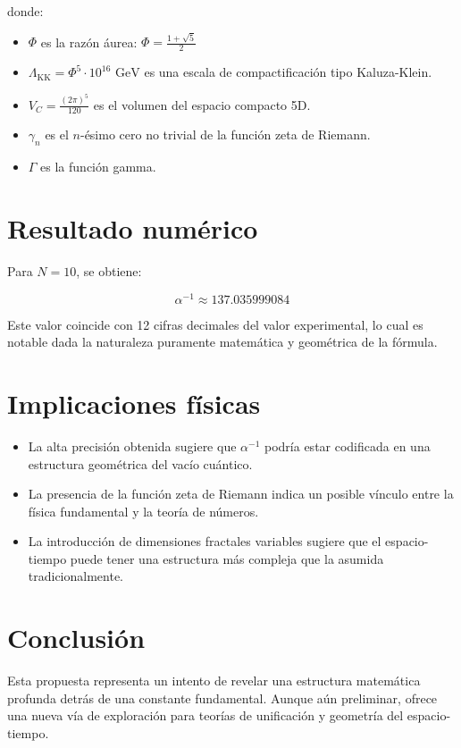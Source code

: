 \documentclass[11pt]{article}
\begin{document}
donde:

\begin{itemize}
  \item $\Phi$ es la razón áurea: $\Phi = \frac{1 + \sqrt{5}}{2}$
  \item $\Lambda_{\text{KK}} = \Phi^5 \cdot 10^{16} \text{ GeV}$ es una escala de compactificación tipo Kaluza-Klein.
  \item $V_C = \frac{(2\pi)^5}{120}$ es el volumen del espacio compacto 5D.
  \item $\gamma_n$ es el $n$-ésimo cero no trivial de la función zeta de Riemann.
  \item $\Gamma$ es la función gamma.
\end{itemize}

\section{Resultado numérico}

Para $N = 10$, se obtiene:

\[
\alpha^{-1} \approx 137.035999084
\]

Este valor coincide con 12 cifras decimales del valor experimental, lo cual es notable dada la naturaleza puramente matemática y geométrica de la fórmula.

\section{Implicaciones físicas}

\begin{itemize}
  \item La alta precisión obtenida sugiere que $\alpha^{-1}$ podría estar codificada en una estructura geométrica del vacío cuántico.
  \item La presencia de la función zeta de Riemann indica un posible vínculo entre la física fundamental y la teoría de números.
  \item La introducción de dimensiones fractales variables sugiere que el espacio-tiempo puede tener una estructura más compleja que la asumida tradicionalmente.
\end{itemize}

\section{Conclusión}

Esta propuesta representa un intento de revelar una estructura matemática profunda detrás de una constante fundamental. Aunque aún preliminar, ofrece una nueva vía de exploración para teorías de unificación y geometría del espacio-tiempo.
\end{document}

